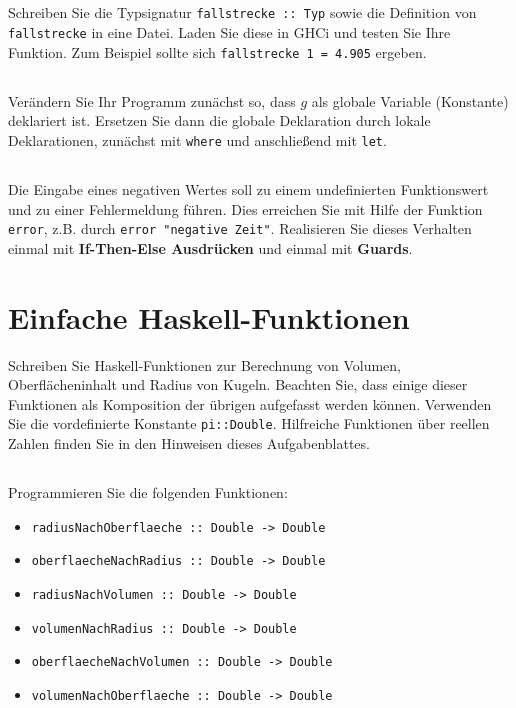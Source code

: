 \documentclass[
  10pt,                   %
  DIV12,
  german,                 %
  oneside,                %
  parskip=half,           %
  headings=normal,        %
  captions=tableheading,  %
]{scrartcl}
\begin{document}
\subsection{}
Schreiben Sie die Typsignatur \lstinline|fallstrecke :: Typ| sowie die Definition von \lstinline|fallstrecke| in eine Datei. Laden Sie diese in GHCi und testen Sie Ihre Funktion. Zum Beispiel sollte sich \lstinline|fallstrecke 1 = 4.905| ergeben.
\subsection{}
Verändern Sie Ihr Programm zunächst so, dass $g$ als globale Variable (Konstante) deklariert ist. Ersetzen Sie dann die globale Deklaration durch lokale Deklarationen, zunächst mit \lstinline|where| und anschließend mit \lstinline|let|.
\subsection{}
Die Eingabe eines negativen Wertes soll zu einem undefinierten Funktionswert
und zu einer Fehlermeldung führen. Dies erreichen Sie mit Hilfe der Funktion
\lstinline|error|, z.B. durch \lstinline|error "negative Zeit"|. Realisieren Sie dieses Verhalten einmal mit \textbf{If-Then-Else Ausdrücken} und einmal mit \textbf{Guards}.
\section{Einfache Haskell-Funktionen}
Schreiben Sie Haskell-Funktionen zur Berechnung von Volumen, Oberflächeninhalt und Radius von Kugeln. Beachten Sie, dass einige dieser Funktionen als Komposition der übrigen aufgefasst werden können. Verwenden Sie die vordefinierte Konstante \lstinline|pi::Double|.
Hilfreiche Funktionen über reellen Zahlen finden Sie in den Hinweisen dieses Aufgabenblattes.
\subsection{}
Programmieren Sie die folgenden Funktionen:\\
\begin{itemize}
\item \lstinline|radiusNachOberflaeche :: Double -> Double|
\item \lstinline|oberflaecheNachRadius :: Double -> Double|
\item \lstinline|radiusNachVolumen :: Double -> Double|
\item \lstinline|volumenNachRadius :: Double -> Double|
\item \lstinline|oberflaecheNachVolumen :: Double -> Double|
\item \lstinline|volumenNachOberflaeche :: Double -> Double|
\end{itemize}
\end{document}
